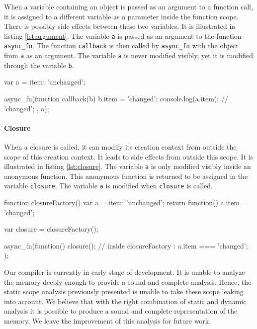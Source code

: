 When a variable containing an object is passed as an argument to a function call, it is assigned to a different variable as a parameter inside the function scope.
There is possibly side effects between these two variables.
It is illustrated in listing \ref{lst:argument}.
The variable \texttt{a} is passed as an argument to the function \texttt{async\_fn}.
The function \texttt{callback} is then called by \texttt{async\_fn} with the object from \texttt{a} as an argument.
The variable \texttt{a} is never modified visibly, yet it is modified through the variable \texttt{b}.

\begin{code}[js, caption={Example of a scope leak due to a function call},label={lst:argument}]
var a = {item: 'unchanged'};

async_fn(function callback(b) {
  b.item = 'changed';
  console.log(a.item); // 'changed';
}, a);
\end{code}

\paragraph{Closure}

When a closure is called, it can modify its creation context from outside the scope of this creation context.
It leads to side effects from outside this scope.
It is illustrated in listing \ref{lst:closure}.
The variable \texttt{a} is only modified visibly inside an anonymous function.
This anonymous function is returned to be assigned in the variable \texttt{closure}.
The variable \texttt{a} is modified when \texttt{closure} is called.

\begin{code}[js, caption={Example of a scope leak due to a closure},label={lst:closure}]
function closureFactory() {
  var a = {item: 'unchanged'};
  return function() {
    a.item = 'changed';
  }
}

var closure = closureFactory();

async_fn(function() {
  closure();
  // inside closureFactory : a.item === 'changed';
});
\end{code}

Our compiler is currently in early stage of development.
It is unable to analyze the memory deeply enough to provide a sound and complete analysis.
Hence, the static scope analysis previously presented is unable to take these scope leaking into account.
We believe that with the right combination of static and dynamic analysis it is possible to produce a sound and complete representation of the memory.
We leave the improvement of this analysis for future work.

